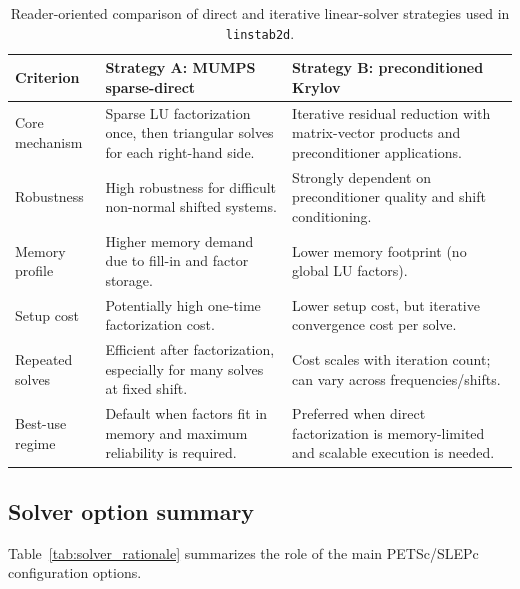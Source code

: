 \documentclass[11pt]{article}
\begin{document}
\begin{table}[t]
\centering
\small
\setlength{\tabcolsep}{5pt}
\begin{tabular}{L{2.8cm}L{4.4cm}L{4.4cm}}
\toprule
Criterion & Strategy A: MUMPS sparse-direct & Strategy B: preconditioned Krylov \\
\midrule
Core mechanism & Sparse LU factorization once, then triangular solves for each right-hand side. & Iterative residual reduction with matrix-vector products and preconditioner applications. \\
Robustness & High robustness for difficult non-normal shifted systems. & Strongly dependent on preconditioner quality and shift conditioning. \\
Memory profile & Higher memory demand due to fill-in and factor storage. & Lower memory footprint (no global LU factors). \\
Setup cost & Potentially high one-time factorization cost. & Lower setup cost, but iterative convergence cost per solve. \\
Repeated solves & Efficient after factorization, especially for many solves at fixed shift. & Cost scales with iteration count; can vary across frequencies/shifts. \\
Best-use regime & Default when factors fit in memory and maximum reliability is required. & Preferred when direct factorization is memory-limited and scalable execution is needed. \\
\bottomrule
\end{tabular}
\caption{Reader-oriented comparison of direct and iterative linear-solver strategies used in \texttt{linstab2d}.}
\label{tab:direct_iterative_compare}
\end{table}

\subsection{Solver option summary}
\label{sec:solver_summary}

Table~\ref{tab:solver_rationale} summarizes the role of the main PETSc/SLEPc configuration options.
\end{document}
